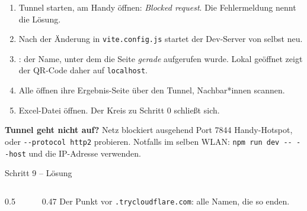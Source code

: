 \begin{lecturer}
\begin{frame}{}
  \footnotesize
  \begin{enumerate}
    \item Tunnel starten, am Handy öffnen: \emph{Blocked request}. Die Fehlermeldung nennt die Lösung.
    \item Nach der Änderung in \texttt{vite.config.js} startet der Dev-Server von selbst neu.
    \item {}: der Name, unter dem die Seite \emph{gerade} aufgerufen wurde.
          Lokal geöffnet zeigt der QR-Code daher auf \texttt{localhost}.
    \item Alle öffnen ihre Ergebnis-Seite über den Tunnel, Nachbar*innen scannen.
    \item Excel-Datei öffnen. Der Kreis zu Schritt 0 schließt sich.
  \end{enumerate}
  \textbf{Tunnel geht nicht auf?} Netz blockiert ausgehend Port 7844 \textarrow{} Handy-Hotspot,
  oder \texttt{-{}-protocol http2} probieren. Notfalls im selben WLAN:
  \texttt{npm run dev -{}- -{}-host} und die IP-Adresse verwenden.
\end{frame}
\end{lecturer}

\begin{loesung}
\begin{frame}[fragile]{Schritt 9 -- Lösung}
  \begin{columns}[onlytextwidth,t]
    \begin{column}{0.5\textwidth}
    \end{column}
    \begin{column}{0.47\textwidth}
      \vspace{0.3em}
      \vspace{0.3em}
      {\footnotesize Der Punkt vor \texttt{.trycloudflare.com}: alle Namen, die so enden.}
    \end{column}
  \end{columns}
\end{frame}
\end{loesung}

